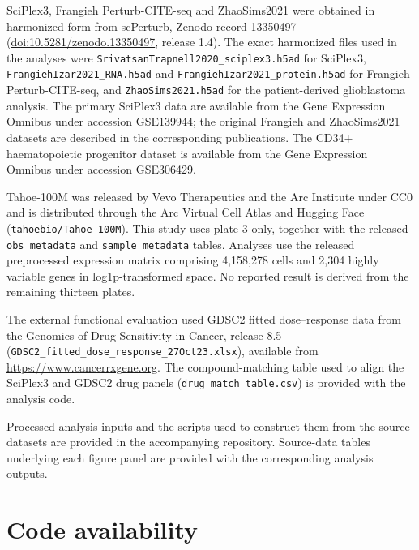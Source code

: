 \documentclass[11pt,letterpaper]{article}
\begin{document}
SciPlex3, Frangieh Perturb-CITE-seq and ZhaoSims2021 were obtained in harmonized form
from scPerturb\cite{ref3}, Zenodo record 13350497
(\href{https://doi.org/10.5281/zenodo.13350497}{doi:10.5281/zenodo.13350497},
release 1.4). The exact harmonized files used in the analyses were
\texttt{SrivatsanTrapnell2020\_sciplex3.h5ad} for SciPlex3,
\texttt{FrangiehIzar2021\_RNA.h5ad} and
\texttt{FrangiehIzar2021\_protein.h5ad} for Frangieh Perturb-CITE-seq,
and \texttt{ZhaoSims2021.h5ad} for the patient-derived glioblastoma analysis.
The primary SciPlex3 data are available from the Gene Expression Omnibus under
accession GSE139944\cite{dataSciPlex3}; the original Frangieh and ZhaoSims2021
datasets are described in the corresponding publications\cite{dataFrangieh,dataZhao}.
The CD34$+$ haematopoietic progenitor dataset is available from the Gene Expression
Omnibus under accession GSE306429.

Tahoe-100M\cite{Tahoe100M} was released by Vevo Therapeutics and the Arc Institute
under CC0 and is distributed through the Arc Virtual Cell Atlas and Hugging Face
(\texttt{tahoebio/Tahoe-100M}). This study uses plate 3 only, together with the
released \texttt{obs\_metadata} and \texttt{sample\_metadata} tables. Analyses use
the released preprocessed expression matrix comprising 4,158,278 cells and 2,304
highly variable genes in log1p-transformed space. No reported result is derived from
the remaining thirteen plates.

The external functional evaluation used GDSC2 fitted dose--response data from the
Genomics of Drug Sensitivity in Cancer, release 8.5
(\texttt{GDSC2\_fitted\_dose\_response\_27Oct23.xlsx}), available from
\url{https://www.cancerrxgene.org}. The compound-matching table used to align the
SciPlex3 and GDSC2 drug panels (\texttt{drug\_match\_table.csv}) is provided with the
analysis code.

Processed analysis inputs and the scripts used to construct them from the source
datasets are provided in the accompanying repository. Source-data tables underlying
each figure panel are provided with the corresponding analysis outputs.


\section*{Code availability}
\end{document}
